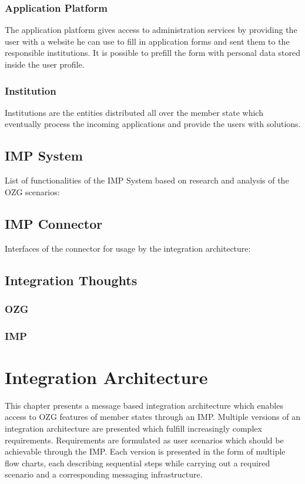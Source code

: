 \documentclass[
     12pt,         %
     a4paper,      %
     BCOR=10mm,version=first,     %
     DIV=14,version=first,        %
     ]{scrreprt}
\begin{document}
\subsection{Application Platform}
The application platform gives access to administration services by providing the user with a website he can use to fill in application forms and sent them to the responsible institutions. It is possible to prefill the form with personal data stored inside the user profile.

\subsection{Institution}
Institutions are the entities distributed all over the member state which eventually process the incoming applications and provide the users with solutions.

\section{IMP System}
List of functionalities of the IMP System based on research and analysis of the OZG scenarios:

\section{IMP Connector}
Interfaces of the connector for usage by the integration architecture:

\section{Integration Thoughts}

\subsection{OZG}


\subsection{IMP}


\chapter{Integration Architecture}

This chapter presents a message based integration architecture which enables access to OZG features of member states through an IMP. Multiple versions of an integration architecture are presented which fulfill increasingly complex requirements. Requirements are formulated as user scenarios which should be achievable through the IMP.
Each version is presented in the form of multiple flow charts, each describing sequential steps while carrying out a required scenario and a corresponding messaging infrastructure.
\end{document}
